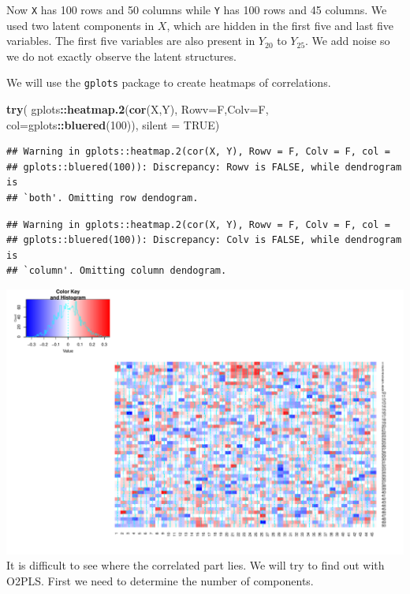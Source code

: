 \documentclass[]{article}
\newenvironment{Shaded}{\begin{snugshade}}{\end{snugshade}}
\newcommand{\DataTypeTok}[1]{\textcolor[rgb]{0.13,0.29,0.53}{#1}}
\newcommand{\DecValTok}[1]{\textcolor[rgb]{0.00,0.00,0.81}{#1}}
\newcommand{\KeywordTok}[1]{\textcolor[rgb]{0.13,0.29,0.53}{\textbf{#1}}}
\newcommand{\NormalTok}[1]{#1}
\newcommand{\OperatorTok}[1]{\textcolor[rgb]{0.81,0.36,0.00}{\textbf{#1}}}
\newcommand{\OtherTok}[1]{\textcolor[rgb]{0.56,0.35,0.01}{#1}}
\begin{document}
Now \texttt{X} has 100 rows and 50 columns while \texttt{Y} has 100 rows
and 45 columns. We used two latent components in \(X\), which are hidden
in the first five and last five variables. The first five variables are
also present in \(Y_{20}\) to \(Y_{25}\). We add noise so we do not
exactly observe the latent structures.

We will use the \texttt{gplots} package to create heatmaps of
correlations.

\begin{Shaded}
\begin{Highlighting}[]
\KeywordTok{try}\NormalTok{(}
\NormalTok{  gplots}\OperatorTok{::}\KeywordTok{heatmap.2}\NormalTok{(}\KeywordTok{cor}\NormalTok{(X,Y), }\DataTypeTok{Rowv=}\NormalTok{F,}\DataTypeTok{Colv=}\NormalTok{F, }\DataTypeTok{col=}\NormalTok{gplots}\OperatorTok{::}\KeywordTok{bluered}\NormalTok{(}\DecValTok{100}\NormalTok{)),}
  \DataTypeTok{silent =} \OtherTok{TRUE}\NormalTok{)}
\end{Highlighting}
\end{Shaded}

\begin{verbatim}
## Warning in gplots::heatmap.2(cor(X, Y), Rowv = F, Colv = F, col =
## gplots::bluered(100)): Discrepancy: Rowv is FALSE, while dendrogram is
## `both'. Omitting row dendogram.
\end{verbatim}

\begin{verbatim}
## Warning in gplots::heatmap.2(cor(X, Y), Rowv = F, Colv = F, col =
## gplots::bluered(100)): Discrepancy: Colv is FALSE, while dendrogram is
## `column'. Omitting column dendogram.
\end{verbatim}

\includegraphics{Figs/unnamed-chunk-2-1.pdf} It is difficult to see
where the correlated part lies. We will try to find out with O2PLS.
First we need to determine the number of components.
\end{document}
